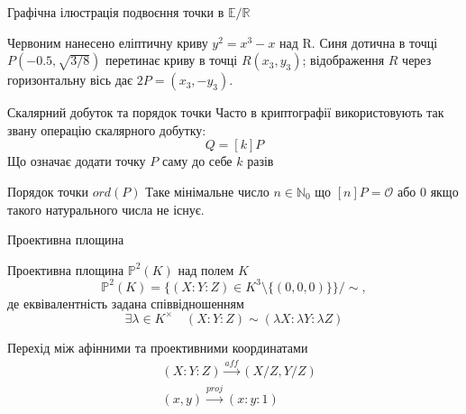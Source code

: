 \documentclass[9pt]{beamer}
\begin{document}
\begin{darkframes}
\begin{frame}{Графічна ілюстрація подвоєння точки в $\mathbb{E/R}$}
\begin{center}
  \end{center}
  \vspace{0.3cm}
  \footnotesize{Червоним нанесено еліптичну криву \(y^2=x^3-x\) над R. Синя дотична в точці \(P(-0.5,\sqrt{3/8})\) перетинає криву в точці \(R(x_3,y_3)\); відображення \(R\) через горизонтальну вісь дає \(2P=(x_3,-y_3)\).}
\end{frame}


\begin{frame}{Скалярний добуток та порядок точки}
  Часто в криптографії використовують так звану операцію скалярного добутку:
  $$Q=[k]P$$
  Що означає додати точку $P$ саму до себе $k$ разів
  \begin{block}{Порядок точки $ord(P)$}
      Таке мінімальне число $n \in \mathbb{N}_0$ що $[n]P=\mathcal{O}$ або $0$ якщо такого натурального числа не існує.
  \end{block}
\end{frame}

\begin{frame}{Проективна площина}
  \begin{block}{Проективна площина $\mathbb{P}^2(K)$ над полем $K$}
    \[
    \mathbb{P}^2(K) = \{(X:Y:Z) \in K^3 \setminus \{(0,0,0)\}\} \big/ \sim,
    \]
    де еквівалентність задана співвідношенням
    \[
    \exists \lambda\in K^\times \quad (X:Y:Z) \sim (\lambda X:\lambda Y:\lambda Z)
    \]
  \end{block}
  \begin{block}{Перехід між афінними та проективними координатами}
    \begin{align}
        & (X:Y:Z) \xrightarrow{aff} (X/Z, Y/Z) \\
        & (x,y) \xrightarrow{proj} (x: y: 1)
    \end{align}
  \end{block}
\end{frame}


\end{darkframes}
\end{document}
